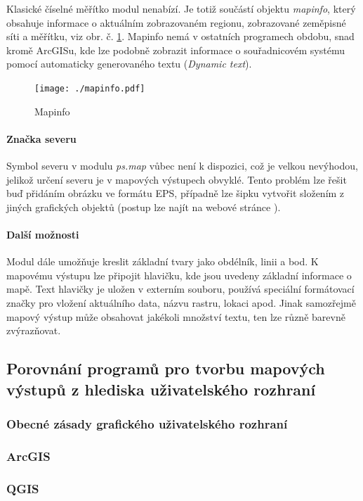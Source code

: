 \documentclass[a4paper,12pt,draft]{article}
\newcommand{\modul}[1]{\emph{#1}}
\begin{document}
Klasické číselné měřítko modul nenabízí. Je totiž součástí objektu \emph{mapinfo}, který obsahuje informace o aktuálním zobrazovaném regionu, zobrazované zeměpisné síti a měřítku, viz obr. č. \ref{fig:mapinfo}. Mapinfo nemá v ostatních programech obdobu, snad kromě ArcGISu, kde lze podobně zobrazit informace o souřadnicovém systému pomocí automaticky generovaného textu (\emph{Dynamic text}). 
\begin{figure}[h!]
    \centering
    \texttt{[image: ./mapinfo.pdf]}
    \caption{Mapinfo}
    \label{fig:mapinfo}
\end{figure}

\paragraph*{Značka severu}
Symbol severu v modulu \modul{ps.map} vůbec není k dispozici, což je velkou nevýhodou, jelikož určení severu je v mapových výstupech obvyklé. Tento problém lze řešit buď přidáním obrázku ve formátu EPS, případně lze šipku vytvořit složením z jiných grafických objektů (postup lze najít na webové stránce \cite{wiki_psmap_north}).

\paragraph*{Další možnosti}
Modul dále umožňuje kreslit základní tvary jako obdélník, linii a bod. K mapovému výstupu lze připojit hlavičku, kde jsou uvedeny základní informace o mapě. Text hlavičky je uložen v externím souboru, používá speciální formátovací značky pro vložení aktuálního data, názvu rastru, lokaci apod. Jinak samozřejmě mapový výstup může obsahovat jakékoli množství textu, ten lze různě barevně zvýrazňovat.

\subsection{Porovnání programů pro tvorbu mapových výstupů z hlediska uživatelského rozhraní }
\subsubsection{Obecné zásady grafického uživatelského rozhraní}
\subsubsection{ArcGIS}

\subsubsection{QGIS}
\end{document}

